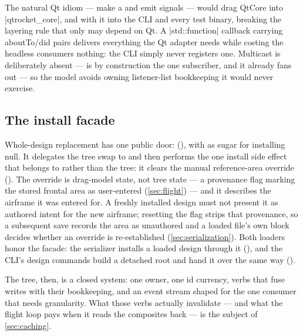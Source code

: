 \begin{rejected}
The natural Qt idiom --- make  a  and emit signals --- would drag
QtCore into \cppinline|qtrocket_core|, and with it into the CLI and every test binary, breaking the
layering rule that only  may depend on Qt. A \cppinline|std::function| callback
carrying aboutTo/did pairs delivers everything the Qt adapter needs while costing the headless
consumers nothing: the CLI simply never registers one. Multicast is deliberately absent ---
 is by construction the one subscriber, and it already fans out --- so the model
avoids owning listener-list bookkeeping it would never exercise.
\end{rejected}

\subsection{The install facade}\label{sec:tree-install}

Whole-design replacement has one public door: 
(), with  as sugar for installing null.
It delegates the tree swap to  and then performs the one install
side effect that belongs to  rather than the tree: it clears the manual
reference-area override (). The override is drag-model state,
not tree state --- a provenance flag marking the stored frontal area as user-entered
(\cref{sec:flight}) --- and it describes the airframe it was entered for. A freshly installed
design must not present it as authored intent for the new airframe; resetting the flag strips
that provenance, so a subsequent save records the area as unauthored and a loaded file's own
 block decides whether an override is re-established (\cref{sec:serialization}).
Both loaders honor the facade: the serializer installs a loaded
design through it (), and the CLI's design commands
build a detached root and hand it over the same way ().

The tree, then, is a closed system: one owner, one id currency, verbs that fuse writes with their
bookkeeping, and an event stream shaped for the one consumer that needs granularity. What those
verbs actually invalidate --- and what the flight loop pays when it reads the composites back ---
is the subject of \cref{sec:caching}.
